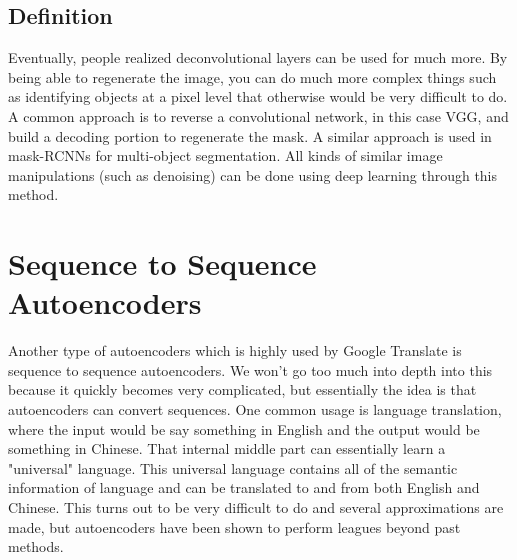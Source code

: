 \documentclass{article}
\begin{document}
\subsection{Definition}
Eventually, people realized deconvolutional layers can be used for much more. By being able to regenerate the image, you can do much more complex things such as identifying objects at a pixel level that otherwise would be very difficult to do. A common approach is to reverse a convolutional network, in this case VGG, and build a decoding portion to regenerate the mask. A similar approach is used in mask-RCNNs for multi-object segmentation. All kinds of similar image manipulations (such as denoising) can be done using deep learning through this method.

\section{Sequence to Sequence Autoencoders}
Another type of autoencoders which is highly used by Google Translate is sequence to sequence autoencoders. We won't go too much into depth into this because it quickly becomes very complicated, but essentially the idea is that autoencoders can convert sequences. One common usage is language translation, where the input would be say something in English and the output would be something in Chinese. That internal middle  part can essentially learn a "universal" language. This universal language contains all of the semantic information of language and can be translated to and from both English and Chinese. This turns out to be very difficult to do and several approximations are made, but autoencoders have been shown to perform leagues beyond past methods.
\end{document}

